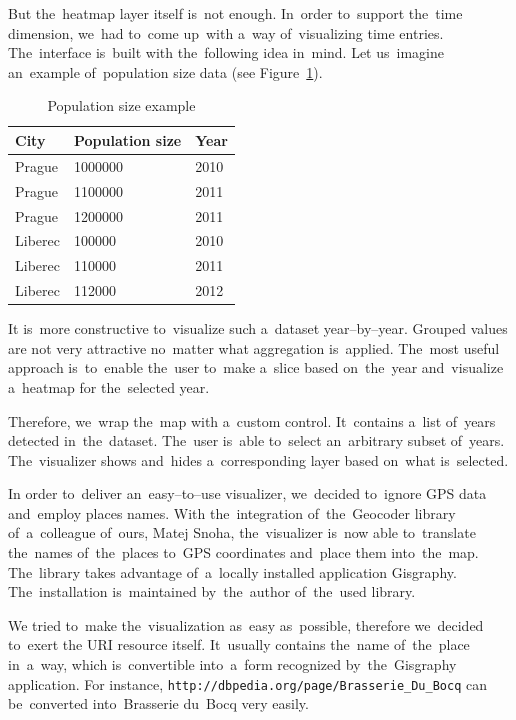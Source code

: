 But the~heatmap layer itself is~not enough. In~order to~support the~time 
dimension, we~had to~come up~with a~way of~visualizing time entries. The~interface is~built with the~following idea in~mind. Let us~imagine an~example of~population size data (see Figure~\ref{fig:impl-pop-ex}).

\begin{table}
  \begin{center}
\begin{tabular}{l|l|l}
  City & Population size & Year \\ \hline
  Prague   &    1000000   &   2010 \\
  Prague   &    1100000   &   2011 \\
  Prague   &    1200000   &   2011 \\
  Liberec   &    100000    &  2010 \\
  Liberec   &    110000    &  2011 \\
  Liberec    &   112000    &  2012
\end{tabular}
\caption{Population size example}
\label{fig:impl-pop-ex}
  \end{center}
\end{table}

It is~more constructive to~visualize such a~dataset year--by--year. Grouped values are 
not very attractive no~matter what aggregation is~applied. The~most useful 
approach is~to~enable the~user to~make a~slice based on~the~year and~visualize a~heatmap for the~selected year.

Therefore, we~wrap the~map with a~custom control. It~contains a~list of~years 
detected in~the~dataset. The~user is~able to~select an~arbitrary subset of~years. The~visualizer shows and~hides a~corresponding layer based on~what is~selected. 

In order to~deliver an~easy--to--use visualizer, we~decided to~ignore GPS 
data and~employ places names. With the~integration of~the~Geocoder library of~a~colleague of~ours, Matej Snoha, the~visualizer is~now able to~translate the~names of~the~places to~GPS coordinates and~place them into~the~map. The~library takes 
advantage of~a~locally installed application Gisgraphy. The~installation is~maintained by~the~author of~the~used library.

We tried to~make the~visualization as~easy as~possible, therefore we~decided to~exert the
URI resource itself. It~usually contains the~name of~the~place 
in~a~way, which is~convertible into~a~form recognized by~the~Gisgraphy 
application. For instance, \texttt{http://dbpedia.org/page/Brasserie\_Du\_Bocq} 
can be~converted into~Brasserie du~Bocq very easily.

